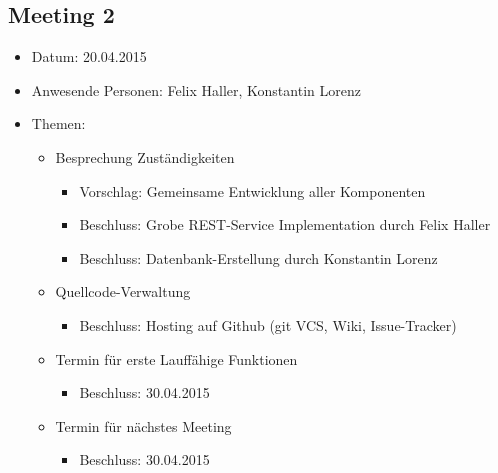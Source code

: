 \documentclass[12pt]{scrartcl}
\begin{document}
		\subsection{Meeting 2}
		\begin{itemize}
			\item Datum: 20.04.2015
			\item Anwesende Personen: Felix Haller, Konstantin Lorenz
			\item Themen:
			\begin{itemize}
				\item Besprechung Zuständigkeiten
				\begin{itemize}
					\item Vorschlag: Gemeinsame Entwicklung aller Komponenten
					\item Beschluss: Grobe REST-Service Implementation durch Felix Haller
					\item Beschluss: Datenbank-Erstellung durch Konstantin Lorenz
				\end{itemize}
				\item Quellcode-Verwaltung
				\begin{itemize}
					\item Beschluss: Hosting auf Github (git VCS, Wiki, Issue-Tracker)
				\end{itemize}
				\item Termin für erste Lauffähige Funktionen
				\begin{itemize}
					\item Beschluss: 30.04.2015
				\end{itemize}
				\item Termin für nächstes Meeting
				\begin{itemize}
					\item Beschluss: 30.04.2015
				\end{itemize}
			\end{itemize}
		\end{itemize}
		
\end{document}
